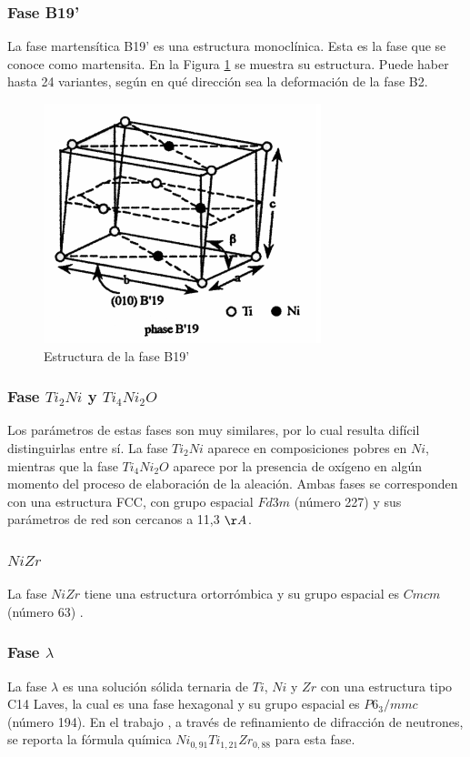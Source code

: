 \documentclass[12pt]{article}
\theoremstyle{definition}
\theoremstyle{remark}
\begin{document}
\subsubsection{Fase B19'}
La fase martensítica B19' es una estructura monoclínica. Esta es la fase que se conoce como martensita. En la Figura \ref{B19pPhase} se muestra su estructura. Puede haber hasta 24 variantes, según en qué dirección sea la deformación de la fase B2.
\begin{figure}[H]
	\centering
	\includegraphics[scale=0.5]{img/B19pPhase.png}
	\caption{Estructura de la fase B19'}
	\label{B19pPhase}
\end{figure}

\subsubsection{Fase $Ti_2Ni$ y $Ti_4Ni_2O$}

Los parámetros de estas fases son muy similares, por lo cual resulta difícil distinguirlas entre sí. La fase $Ti_2Ni$ aparece en composiciones pobres en $Ni$, mientras que la fase $Ti_4Ni_2O$ aparece por la presencia de oxígeno en algún momento del proceso de elaboración de la aleación. Ambas fases se corresponden con una estructura FCC, con grupo espacial $Fd3m$ (número 227) y sus parámetros de red son cercanos a 11,3 $\AA$.

\subsubsection{$NiZr$}
La fase $NiZr$ tiene una estructura ortorrómbica y su grupo espacial es $Cmcm$ (número 63) \cite{Kirkpatrick1962}.

\subsubsection{Fase $\lambda$}
La fase $\lambda$ es una solución sólida ternaria de $Ti$, $Ni$ y $Zr$ con una estructura tipo C14 Laves, la cual es una fase hexagonal y su grupo espacial es $P6_3/mmc$ (número 194). En el trabajo \cite{Bououdina2003}, a través de refinamiento de difracción de neutrones, se reporta la fórmula química $Ni_{0,91}Ti_{1,21}Zr_{0,88}$ para esta fase.
\end{document}
